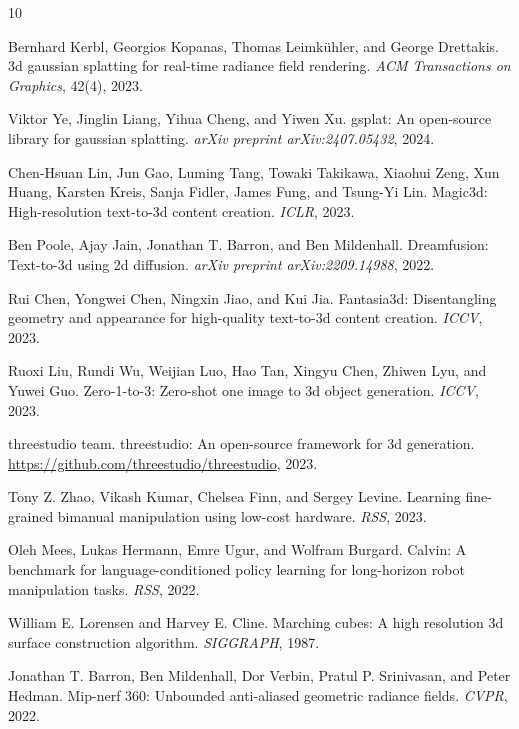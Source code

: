 \documentclass[10pt,twocolumn,letterpaper]{article}
\begin{document}

\begin{thebibliography}{10}

Bernhard Kerbl, Georgios Kopanas, Thomas Leimk{\"u}hler, and George Drettakis.
\newblock 3d gaussian splatting for real-time radiance field rendering.
\newblock \emph{ACM Transactions on Graphics}, 42(4), 2023.

Viktor Ye, Jinglin Liang, Yihua Cheng, and Yiwen Xu.
\newblock gsplat: An open-source library for gaussian splatting.
\newblock \emph{arXiv preprint arXiv:2407.05432}, 2024.

Chen-Hsuan Lin, Jun Gao, Luming Tang, Towaki Takikawa, Xiaohui Zeng, Xun Huang, Karsten Kreis, Sanja Fidler, James Fung, and Tsung-Yi Lin.
\newblock Magic3d: High-resolution text-to-3d content creation.
\newblock \emph{ICLR}, 2023.

Ben Poole, Ajay Jain, Jonathan T. Barron, and Ben Mildenhall.
\newblock Dreamfusion: Text-to-3d using 2d diffusion.
\newblock \emph{arXiv preprint arXiv:2209.14988}, 2022.

Rui Chen, Yongwei Chen, Ningxin Jiao, and Kui Jia.
\newblock Fantasia3d: Disentangling geometry and appearance for high-quality text-to-3d content creation.
\newblock \emph{ICCV}, 2023.

Ruoxi Liu, Rundi Wu, Weijian Luo, Hao Tan, Xingyu Chen, Zhiwen Lyu, and Yuwei Guo.
\newblock Zero-1-to-3: Zero-shot one image to 3d object generation.
\newblock \emph{ICCV}, 2023.

threestudio team.
\newblock threestudio: An open-source framework for 3d generation.
\newblock \url{https://github.com/threestudio/threestudio}, 2023.

Tony Z. Zhao, Vikash Kumar, Chelsea Finn, and Sergey Levine.
\newblock Learning fine-grained bimanual manipulation using low-cost hardware.
\newblock \emph{RSS}, 2023.

Oleh Mees, Lukas Hermann, Emre Ugur, and Wolfram Burgard.
\newblock Calvin: A benchmark for language-conditioned policy learning for long-horizon robot manipulation tasks.
\newblock \emph{RSS}, 2022.

William E. Lorensen and Harvey E. Cline.
\newblock Marching cubes: A high resolution 3d surface construction algorithm.
\newblock \emph{SIGGRAPH}, 1987.

Jonathan T. Barron, Ben Mildenhall, Dor Verbin, Pratul P. Srinivasan, and Peter Hedman.
\newblock Mip-nerf 360: Unbounded anti-aliased geometric radiance fields.
\newblock \emph{CVPR}, 2022.

\end{thebibliography}
\end{document}
